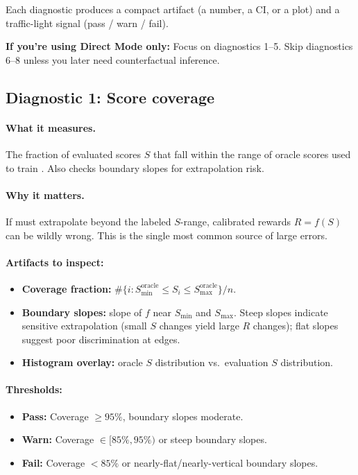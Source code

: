 Each diagnostic produces a compact artifact (a number, a CI, or a plot) and a traffic-light signal (pass / warn / fail).

\textbf{If you're using Direct Mode only:} Focus on diagnostics 1--5. Skip diagnostics 6--8 unless you later need counterfactual inference.

\subsection{Diagnostic 1: Score coverage}

\paragraph{What it measures.} The fraction of evaluated scores $S$ that fall within the range of oracle scores used to train \autocal. Also checks boundary slopes for extrapolation risk.

\paragraph{Why it matters.} If \autocal{} must extrapolate beyond the labeled $S$-range, calibrated rewards $R = f(S)$ can be wildly wrong. This is the single most common source of large errors.

\paragraph{Artifacts to inspect:}
\begin{itemize}
\item \textbf{Coverage fraction:} $\#\{i : S_{\min}^{\text{oracle}} \le S_i \le S_{\max}^{\text{oracle}}\} / n$.
\item \textbf{Boundary slopes:} slope of $f$ near $S_{\min}$ and $S_{\max}$. Steep slopes indicate sensitive extrapolation (small $S$ changes yield large $R$ changes); flat slopes suggest poor discrimination at edges.
\item \textbf{Histogram overlay:} oracle $S$ distribution vs.\ evaluation $S$ distribution.
\end{itemize}

\paragraph{Thresholds:}
\begin{itemize}
\item \textbf{Pass:} Coverage $\ge 95\%$, boundary slopes moderate.
\item \textbf{Warn:} Coverage $\in [85\%, 95\%)$ or steep boundary slopes.
\item \textbf{Fail:} Coverage $< 85\%$ or nearly-flat/nearly-vertical boundary slopes.
\end{itemize}

